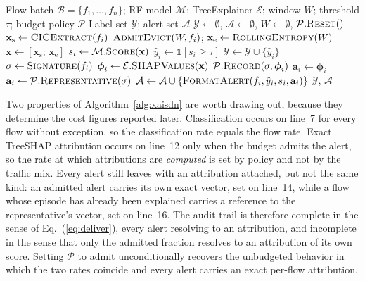\documentclass{ieeeaccess}
\begin{document}
\begin{algorithm}[!t]
\caption{XAI-SDN detection with a budgeted explanation trigger}
\label{alg:xaisdn}
\begin{algorithmic}[1]
\Require Flow batch $\mathcal{B}=\{f_1,\ldots,f_n\}$; RF model $\mathcal{M}$; TreeExplainer $\mathcal{E}$; window $W$; threshold $\tau$; budget policy $\mathcal{P}$
\Ensure Label set $\mathcal{Y}$; alert set $\mathcal{A}$
\State $\mathcal{Y}\leftarrow\emptyset$,\; $\mathcal{A}\leftarrow\emptyset$,\; $W\leftarrow\emptyset$,\; $\mathcal{P}.\textsc{Reset}()$
\State $\mathbf{x}_{\mathrm{s}} \leftarrow \textsc{CICExtract}(f_i)$ 
\State $\textsc{AdmitEvict}(W, f_i)$;\; $\mathbf{x}_{\mathrm{e}} \leftarrow \textsc{RollingEntropy}(W)$ 
\State $\mathbf{x} \leftarrow [\mathbf{x}_{\mathrm{s}};\, \mathbf{x}_{\mathrm{e}}]$ 
\State $s_i \leftarrow \mathcal{M}.\textsc{Score}(\mathbf{x})$ 
\State $\hat{y}_i \leftarrow \mathbb{1}[s_i \geq \tau]$ 
\State $\mathcal{Y}\leftarrow\mathcal{Y}\cup\{\hat{y}_i\}$
 
  \State $\sigma \leftarrow \textsc{Signature}(f_i)$ 
   
    \State $\boldsymbol{\phi}_i \leftarrow \mathcal{E}.\textsc{SHAPValues}(\mathbf{x})$ 
    \State $\mathcal{P}.\textsc{Record}(\sigma, \boldsymbol{\phi}_i)$
    \State $\mathbf{a}_i \leftarrow \boldsymbol{\phi}_i$ 
  \Else
    \State $\mathbf{a}_i \leftarrow \mathcal{P}.\textsc{Representative}(\sigma)$ 
  \EndIf
  \State $\mathcal{A}\leftarrow\mathcal{A}\cup\{\textsc{FormatAlert}(f_i,\hat{y}_i,s_i,\mathbf{a}_i)\}$
\EndIf
\EndFor
\State \Return $\mathcal{Y}$,\; $\mathcal{A}$
\end{algorithmic}
\end{algorithm}

Two properties of Algorithm~\ref{alg:xaisdn} are worth drawing out, because they determine the cost figures reported later. Classification occurs on line~7 for every flow without exception, so the classification rate equals the flow rate. Exact TreeSHAP attribution occurs on line~12 only when the budget admits the alert, so the rate at which attributions are \emph{computed} is set by policy and not by the traffic mix. Every alert still leaves with an attribution attached, but not the same kind: an admitted alert carries its own exact vector, set on line~14, while a flow whose episode has already been explained carries a reference to the representative's vector, set on line~16. The audit trail is therefore complete in the sense of Eq.~(\ref{eq:deliver}), every alert resolving to an attribution, and incomplete in the sense that only the admitted fraction resolves to an attribution of its own score. Setting $\mathcal{P}$ to admit unconditionally recovers the unbudgeted behavior in which the two rates coincide and every alert carries an exact per-flow attribution.
\end{document}
